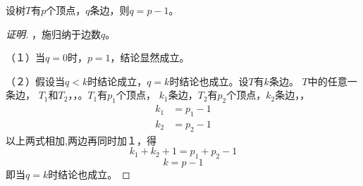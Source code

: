 \documentclass{beamer}
\begin{document}
\begin{CJK*}{UTF8}{gbsn}
\begin{frame}
\end{frame}
\begin{frame}
  \begin{Thm1}\small
  设树$T$有$p$个顶点，$q$条边，则$q = p-1$。
\end{Thm1}\pause
  \begin{proof}[证明]\small
      ，施归纳于边数$q$。\pause
    
    （１）当$q=0$时，$p=1$，结论显然成立。\pause

    （２）假设当$q<k$时结论成立，$q=k$时结论也成立。\pause 设$T$有$k$条边。
    $T$中的任意一条边，
    $T_1$和$T_2$，，。$T_1$有$p_1$个顶点，
    $k_1$条边，\pause$T_2$有$p_2$个顶点，$k_2$条边，，
    \begin{equation*}
      \begin{split}
        k_1 &= p_1 - 1\\
        k_2 &= p_2 - 1
      \end{split}
    \end{equation*}\pause
    以上两式相加,两边再同时加１，得
    \[k_1 + k_2  + 1 = p_1 + p_2 - 1\]
    \[k = p - 1 \]
    即当$q=k$时结论也成立。
\end{proof}


\end{frame}
\end{CJK*}
\end{document}
